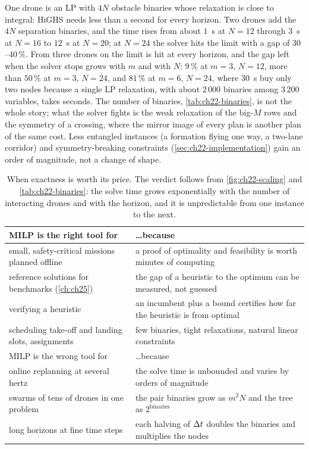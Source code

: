 One drone is an LP with $4N$ obstacle binaries whose relaxation is close
to integral: HiGHS needs less than a second for every horizon. Two drones
add the $4N$ separation binaries, and the time rises from about $1$~s at
$N = 12$ through $3$~s at $N = 16$ to $12$~s at $N = 20$; at $N = 24$ the
solver hits the limit with a gap of $30$--$40$\,\%. From three drones on the limit is hit at
every horizon, and the gap left when the solver stops grows with $m$ and
with $N$: $9$\,\% at $m = 3$, $N = 12$, more than $50$\,\% at $m = 3$,
$N = 24$, and $81$\,\% at $m = 6$, $N = 24$, where $30$~s buy only two
nodes because a single LP relaxation, with about $2\,000$ binaries among $3\,200$
variables, takes seconds. The number of binaries, \cref{tab:ch22-binaries}, is not the whole story; what the
solver fights is the weak relaxation of the big-$M$ rows and the symmetry
of a crossing, where the mirror image of every plan is another plan of the
same cost. Less entangled instances (a formation flying one way, a two-lane
corridor) and symmetry-breaking constraints (\cref{sec:ch22-implementation})
gain an order of magnitude, not a change of shape.

\begin{table}[tb]
  \centering\small
  \caption{When exactness is worth its price. The verdict follows from
  \cref{fig:ch22-scaling} and \cref{tab:ch22-binaries}: the solve time
  grows exponentially with the number of interacting drones and with the
  horizon, and it is unpredictable from one instance to the next.}
  \label{tab:ch22-verdict}
  \begin{tabular}{@{}lL{7.3cm}@{}}
  \toprule
  MILP is the right tool for & \ldots because\\
  \midrule
  small, safety-critical missions planned offline & a proof of optimality and feasibility is worth minutes of computing\\
  reference solutions for benchmarks (\cref{ch:ch25}) & the gap of a heuristic to the optimum can be measured, not guessed\\
  verifying a heuristic & an incumbent plus a bound certifies how far the heuristic is from optimal\\
  scheduling take-off and landing slots, assignments & few binaries, tight relaxations, natural linear constraints\\
  \midrule
  MILP is the wrong tool for & \ldots because\\
  \midrule
  online replanning at several hertz & the solve time is unbounded and varies by orders of magnitude\\
  swarms of tens of drones in one problem & the pair binaries grow as $m^2 N$ and the tree as $2^{\text{binaries}}$\\
  long horizons at fine time steps & each halving of $\Delta t$ doubles the binaries and multiplies the nodes\\
  \bottomrule
  \end{tabular}
\end{table}

